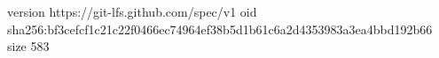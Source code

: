 version https://git-lfs.github.com/spec/v1
oid sha256:bf3cefcf1c21c22f0466ec74964ef38b5d1b61c6a2d4353983a3ea4bbd192b66
size 583
